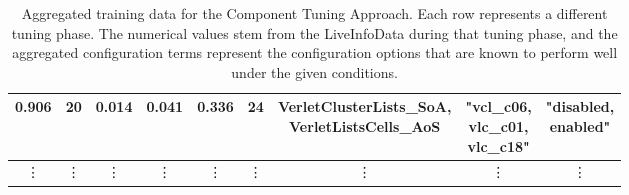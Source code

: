 \begin{table}[H]
\begin{tabular}{|c|c|c|c|c|c|c|c|c|}
        \hline
        0.906                                            & 20                                          & 0.014                                                        & 0.041                                 & 0.336  & 24     & \tabularCenterstack{c}{VerletClusterLists\_SoA,                   \\ VerletListsCells\_AoS} & \tabularCenterstack{c}{"vcl\_c06, \\ vlc\_c01, \\ vlc\_c18"} & \tabularCenterstack{c}{"disabled, \\ enabled"} \\
        \hline
        \vdots                                           & \vdots                                      & \vdots                                                       & \vdots                                & \vdots & \vdots & \vdots                                          & \vdots & \vdots \\
        \hline
    \end{tabular}
    \caption[Aggregated training data for the Component Tuning Approach]{Aggregated training data for the Component Tuning Approach. Each row represents a different tuning phase. The numerical values stem from the LiveInfoData during that tuning phase, and the aggregated configuration terms represent the configuration options that are known to perform well under the given conditions.}
    \label{tab:trainingDataComponent}
\end{table}


